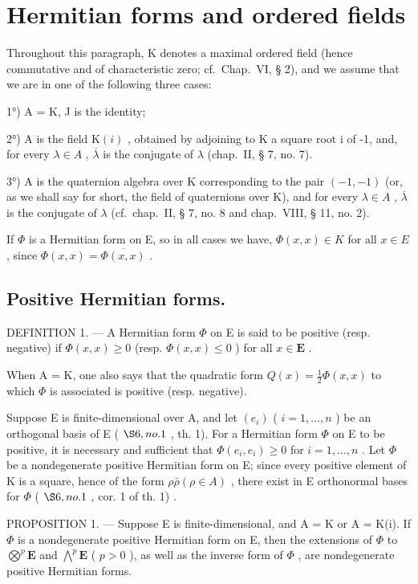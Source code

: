\section{Hermitian forms and ordered fields}

Throughout this paragraph, K denotes a maximal ordered field (hence commutative and of characteristic zero; cf.~Chap.~VI, § 2), and we assume that we are in one of the following three cases:

1°) A = K, J is the identity;

2°) A is the field \(\mathrm{K}(i)\) , obtained by adjoining to K a square root i of -1, and, for every \(\lambda \in A\) , \(\overline{\lambda}\) is the conjugate of \(\lambda\) (chap.~II, § 7, no. 7).

3°) A is the quaternion algebra over K corresponding to the pair \((-1,-1)\) (or, as we shall say for short, the field of quaternions over K), and for every \(\lambda\in A\) , \(\overline{\lambda}\) is the conjugate of \(\lambda\) (cf.~chap.~II, § 7, no. 8 and chap.~VIII, § 11, no. 2).

If \(\Phi\) is a Hermitian form on E, so in all cases we have, \(\Phi(x, x) \in K\) for all \(x \in E\) , since \(\Phi(x, x) = \overline{\Phi(x, x)}\) .

\subsection{Positive Hermitian forms.}

DEFINITION 1. --- A Hermitian form \(\Phi\) on E is said to be positive (resp. negative) if \(\Phi(x, x) \geqslant 0\) (resp. \(\Phi(x, x) \leqslant 0\) ) for all \(x \in \mathbf{E}\) .

When A = K, one also says that the quadratic form \(Q(x) = \frac{1}{2} \Phi(x, x)\) to which \(\Phi\) is associated is positive (resp. negative).

Suppose E is finite-dimensional over A, and let \((e_{i})\) ( \(i = 1, \ldots, n\) ) be an orthogonal basis of E ( \(\S 6, no. 1\) , th. 1). For a Hermitian form \(\Phi\) on E to be positive, it is necessary and sufficient that \(\Phi(e_{i}, e_{i}) \geqslant 0\) for \(i = 1, \ldots, n\) . Let \(\Phi\) be a nondegenerate positive Hermitian form on E; since every positive element of K is a square, hence of the form \(\rho\bar{\rho} (\rho \in A)\) , there exist in E orthonormal bases for \(\Phi\) ( \(\S 6, no. 1\) , cor. 1 of th. 1) .

PROPOSITION 1. --- Suppose E is finite-dimensional, and A = K or A = K(i). If \(\Phi\) is a nondegenerate positive Hermitian form on E, then the extensions of \(\Phi\) to \(\bigotimes^{p}\mathbf{E}\) and \(\bigwedge^{p}\mathbf{E}\) ( \(p > 0\) ), as well as the inverse form of \(\Phi\) , are nondegenerate positive Hermitian forms.


